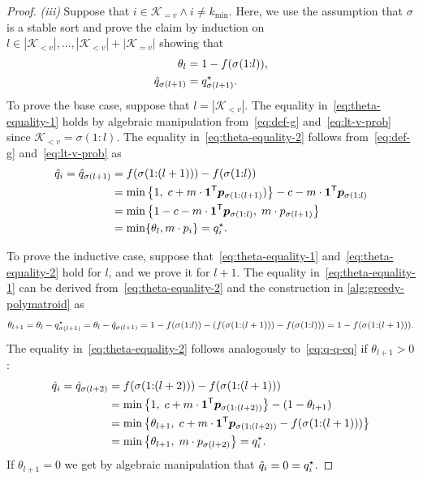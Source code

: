 \documentclass[10pt]{article} %
\begin{document}
\begin{proof}
\emph{(iii)} Suppose that $i \in \mathcal{K}_{=v} \wedge i \neq k_{\min}$. Here, we use the assumption that $\sigma$ is a stable sort and prove the claim by induction on $l \in |\mathcal{K}_{<v}|, \dots, |\mathcal{K}_{<v}| + |\mathcal{K}_{=v}|$ showing that
\begin{align}
 \label{eq:theta-equality-1}
  \theta_l &= 1 - f(\sigma(1{:}l)) ,  \\
  \label{eq:theta-equality-2}
    \hat{q}_{\sigma(l+1)} &= q^{\mathnormal{\star}}_{\sigma(l+1)}.
\end{align}
To prove the base case, suppose that $l = |\mathcal{K}_{<v}|$. The equality in~\eqref{eq:theta-equality-1} holds by algebraic manipulation from~\eqref{eq:def-g} and~\eqref{eq:lt-v-prob} since $\mathcal{K}_{<v} = \sigma(1{:}l)$. The equality in~\eqref{eq:theta-equality-2} follows from~\eqref{eq:def-g} and~\eqref{eq:lt-v-prob} as
\begin{equation} \label{eq:q-q-eq}
  \begin{aligned}
\hat{q}_{i} = \hat{q}_{\sigma(l+1)}  
  &= f ( \sigma(1{:}(l+1) )) - f ( \sigma(1{:}l) ) \\
  &= \min \left\{  1,\; c + m \cdot \bm{1}^{\mathsf{T}} \bm{p}_{\sigma(1{:}(l+1)} )\right\} - c - m \cdot \bm{1}^{\mathsf{T}} \bm{p}_{\sigma(1{:}l)} \\
  &= \min \left\{1  - c - m \cdot \bm{1}^{\mathsf{T}} \bm{p}_{\sigma(1{:}l)}, \; m \cdot p_{\sigma(l+1)}\right\} \\
  &= \min \{ \theta_l, m \cdot p_i \} = q_i^{\mathnormal{\star}}.
  \end{aligned}
\end{equation}

To prove the inductive case, suppose that~\eqref{eq:theta-equality-1} and~\eqref{eq:theta-equality-2} hold for $l$, and we prove it for $l+1$. The equality in~\eqref{eq:theta-equality-1} can be derived from~\eqref{eq:theta-equality-2} and the construction in \cref{alg:greedy-polymatroid} as
\begin{align*}
  \theta_{l+1}
  = \theta_l - q^{\mathnormal{\star}}_{\sigma(l+1)} 
    = \theta_l - \hat{q}_{\sigma(l+1)}
    = 1 - f(\sigma(1{:}l)) - \left(  f(\sigma(1{:}(l+1))) - f(\sigma(1{:}l)) \right) 
  = 1 - f(\sigma(1{:}(l+1))).
\end{align*}
The equality in~\eqref{eq:theta-equality-2} follows analogously to~\eqref{eq:q-q-eq} if $\theta_{l+1} > 0$:
\begin{equation} \label{eq:q-q-eq-2}
  \begin{aligned}
\hat{q}_{i} = \hat{q}_{\sigma(l+2)}
  &= f ( \sigma(1{:}(l+2) )) - f(\sigma(1{:}(l+1))) \\
  &= \min \left\{  1,\; c + m \cdot \bm{1}^{\mathsf{T}} \bm{p}_{\sigma(1{:}(l+2))} \right\} - (1-\theta_{l+1}) \\
  &= \min \left\{\theta_{l+1}, \;c + m \cdot \bm{1}^{\mathsf{T}} \bm{p}_{\sigma(1{:}(l+2))} - f(\sigma(1{:}(l+1))) \right\} \\
  &= \min \left\{\theta_{l+1}, \; m \cdot p_{\sigma(l+2)}  \right\} 
  = q_i^{\mathnormal{\star}}.
  \end{aligned}
\end{equation}
If $\theta_{l+1} = 0$ we get by algebraic manipulation that $\hat{q}_i = 0 = q^{\mathnormal{\star}}_i$.



\end{proof}
\end{document}
